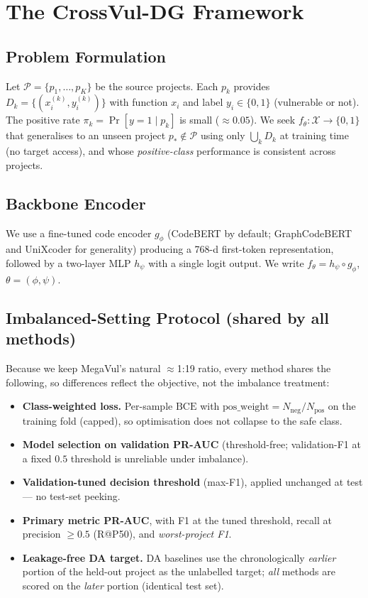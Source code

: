 \documentclass[conference]{IEEEtran}
\begin{document}
\section{The CrossVul-DG Framework}
\subsection{Problem Formulation}
Let $\mathcal{P}=\{p_1,\dots,p_K\}$ be the source projects. Each
$p_k$ provides $D_k=\{(x_i^{(k)},y_i^{(k)})\}$ with function $x_i$
and label $y_i\in\{0,1\}$ (vulnerable or not). The positive rate
$\pi_k=\Pr[y=1\mid p_k]$ is small ($\approx 0.05$). We seek
$f_\theta:\mathcal{X}\to\{0,1\}$ that generalises to an unseen
project $p_\ast\notin\mathcal{P}$ using only
$\bigcup_k D_k$ at training time (no target access), and whose
\emph{positive-class} performance is consistent across projects.

\subsection{Backbone Encoder}
We use a fine-tuned code encoder $g_\phi$ (CodeBERT by default;
GraphCodeBERT and UniXcoder for generality) producing a 768-d
first-token representation, followed by a two-layer MLP $h_\psi$
with a single logit output. We write $f_\theta=h_\psi\circ g_\phi$,
$\theta=(\phi,\psi)$.

\subsection{Imbalanced-Setting Protocol (shared by all methods)}
\label{sec:imbal}
Because we keep MegaVul's natural $\approx$1:19 ratio, every method
shares the following, so differences reflect the objective, not
the imbalance treatment:
\begin{itemize}
\item \textbf{Class-weighted loss.} Per-sample
$\mathrm{BCE}$ with $\mathrm{pos\_weight}=N_{\text{neg}}/N_{\text{pos}}$
on the training fold (capped), so optimisation does not collapse to
the safe class.
\item \textbf{Model selection on validation PR-AUC} (threshold-free;
validation-F1 at a fixed $0.5$ threshold is unreliable under
imbalance).
\item \textbf{Validation-tuned decision threshold} (max-F1),
applied unchanged at test --- no test-set peeking.
\item \textbf{Primary metric PR-AUC}, with F1 at the tuned
threshold, recall at precision $\ge 0.5$ (R@P50), and
\emph{worst-project F1}.
\item \textbf{Leakage-free DA target.} DA baselines use the
chronologically \emph{earlier} portion of the held-out project as
the unlabelled target; \emph{all} methods are scored on the
\emph{later} portion (identical test set).
\end{itemize}
\end{document}

